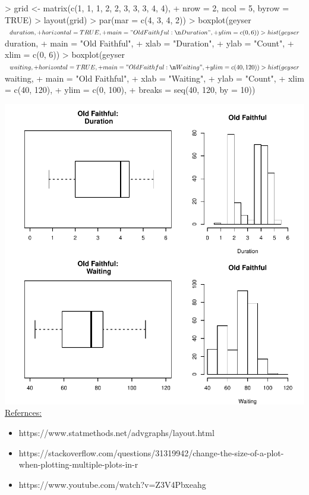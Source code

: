 \documentclass[12pt,letterpaper,final]{article}
\begin{document}
\begin{enumerate}
\begin{enumerate}
\begin{Schunk}
\begin{Sinput}
> grid <- matrix(c(1, 1, 1, 2, 2, 3, 3, 3, 4, 4), 
+               nrow = 2, ncol = 5, byrow = TRUE)
> layout(grid)
> par(mar = c(4, 3, 4, 2))
> boxplot(geyser$duration,
+         horizontal = TRUE,
+         main = "Old Faithful:\n Duration",
+         ylim = c(0, 6))
> hist(geyser$duration,
+      main = "Old Faithful",
+      xlab = "Duration",
+      ylab = "Count",
+      xlim = c(0, 6))
> boxplot(geyser$waiting,
+         horizontal = TRUE,
+         main = "Old Faithful:\n Waiting",
+         ylim = c(40, 120))
> hist(geyser$waiting,
+      main = "Old Faithful",
+      xlab = "Waiting",
+      ylab = "Count",
+      xlim = c(40, 120),
+      ylim = c(0, 100),
+      breaks = seq(40, 120, by = 10))
\end{Sinput}
\end{Schunk}
\includegraphics{rnw_example-016}
\underline{Refernces:}
\begin{itemize}
\item https://www.statmethods.net/advgraphs/layout.html
\item https://stackoverflow.com/questions/31319942/change-the-size-of-a-plot-when-plotting-multiple-plots-in-r
\item https://www.youtube.com/watch?v=Z3V4Pbxeahg
\end{itemize}


\end{enumerate}
\end{enumerate}
\end{document}

